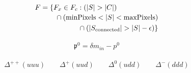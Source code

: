 \documentclass{article}
\newcommand{\bea}{\begin{eqnarray}}
\newcommand{\eea}{\end{eqnarray}}
\begin{document}
\begin{equation}
\begin{multlined}
F = \{F_{x} \in  F_{c} : (|S| > |C|) \\
\shoveleft[1cm]{\cap (\mathrm{minPixels}  < |S| < \mathrm{maxPixels})} \\
\cap (|S_{\mathrm{connected}}| > |S| - \epsilon) \}
\end{multlined}
\end{equation}


\bea
 \mathfrak{p^0}=\delta m_{in}-p^0
\eea

\bea
\Delta^{++}\left( uuu \right) \qquad \Delta^{+}\left( uud \right) \qquad \Delta^{0}\left( udd \right) \qquad \Delta^{-}\left( ddd \right)
\eea

\newpage


 
%
\end{document}
